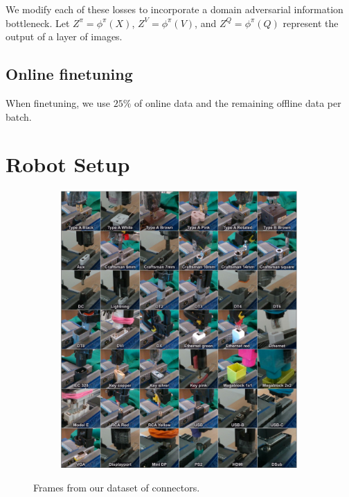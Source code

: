 We modify each of these losses to incorporate a domain adversarial information bottleneck.
Let $Z^\pi = \phi^\pi(X)$, $Z^V = \phi^\pi(V)$, and $Z^Q = \phi^\pi(Q)$ represent the output of a \methodabbrv{} layer of images.



\subsection{Online finetuning}

When finetuning, we use $25\%$ of online data and the remaining offline data per batch.

\section{Robot Setup}

\begin{figure}[th!]
    \centering
    \begin{subfigure}[b]{0.99\linewidth}
        \center
        \includegraphics[width=0.99\textwidth]{daib/imgs/connectors.pdf}
    \end{subfigure}

    \caption{Frames from our dataset of \numconnectors{} connectors.}
    \label{fig:connectortable}
    \vspace{-0.5cm}
\end{figure}

